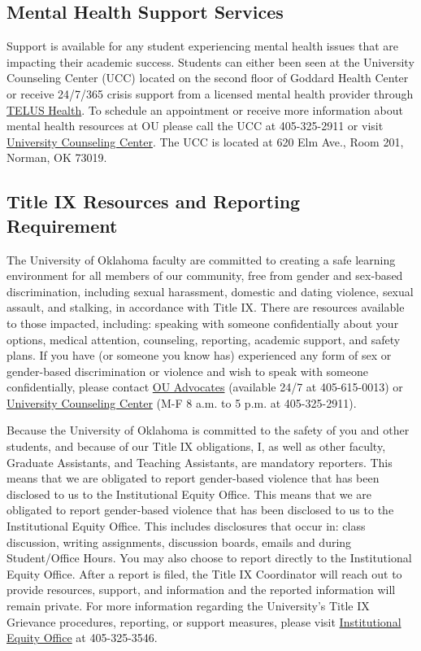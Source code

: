 \documentclass[11pt,english]{article}
\begin{document}
\subsection*{Mental Health Support Services}

Support is available for any student experiencing mental health issues that are impacting their academic success. Students can either been seen at the University Counseling Center (UCC) located on the second floor of Goddard Health Center or receive 24/7/365 crisis support from a licensed mental health provider through \href{https://www.ou.edu/ucc/online-therapy}{TELUS Health}. To schedule an appointment or receive more information about mental health resources at OU please call the UCC at 405-325-2911 or visit \href{https://www.ou.edu/ucc}{University Counseling Center}. The UCC is located at 620 Elm Ave., Room 201, Norman, OK 73019.

\subsection*{Title IX Resources and Reporting Requirement}

The University of Oklahoma faculty are committed to creating a safe learning environment for all members of our community, free from gender and sex-based discrimination, including sexual harassment, domestic and dating violence, sexual assault, and stalking, in accordance with Title IX. There are resources available to those impacted, including: speaking with someone confidentially about your options, medical attention, counseling, reporting, academic support, and safety plans. If you have (or someone you know has) experienced any form of sex or gender-based discrimination or violence and wish to speak with someone confidentially, please contact \href{https://www.ou.edu/gec/gender-based-violence/advocates}{OU Advocates} (available 24/7 at 405-615-0013) or \href{http://ou.edu/ucc}{University Counseling Center} (M-F 8 a.m. to 5 p.m. at 405-325-2911).

Because the University of Oklahoma is committed to the safety of you and other students, and because of our Title IX obligations, I, as well as other faculty, Graduate Assistants, and Teaching Assistants, are mandatory reporters. This means that we are obligated to report gender-based violence that has been disclosed to us to the Institutional Equity Office. This means that we are obligated to report gender-based violence that has been disclosed to us to the Institutional Equity Office. This includes disclosures that occur in: class discussion, writing assignments, discussion boards, emails and during Student/Office Hours. You may also choose to report directly to the Institutional Equity Office. After a report is filed, the Title IX Coordinator will reach out to provide resources, support, and information and the reported information will remain private. For more information regarding the University's Title IX Grievance procedures, reporting, or support measures, please visit \href{https://www.ou.edu/eoo}{Institutional Equity Office} at 405-325-3546.
\end{document}
